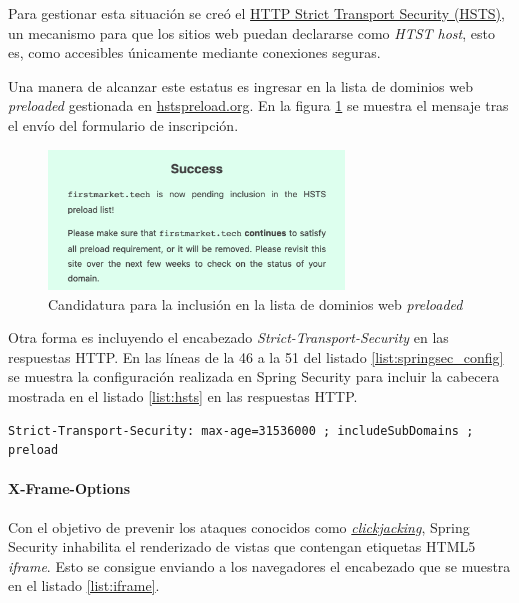 \documentclass[a4paper]{article}
\begin{document}
	Para gestionar esta situación se creó el \href{https://tools.ietf.org/html/rfc6797}{HTTP Strict Transport Security (HSTS)}, un mecanismo para que los sitios web puedan declararse como \emph{HTST host}, esto es, como accesibles únicamente mediante conexiones seguras.
	
	Una manera de alcanzar este estatus es ingresar en la lista de dominios web \emph{preloaded} gestionada en \href{https://hstspreload.org/}{hstspreload.org}. En la figura \ref{fig:preload_list_submission_success} se muestra el mensaje tras el envío del formulario de inscripción.
	
	\begin{figure}[hbt!]
		\centering
		\includegraphics[width=0.7\textwidth,keepaspectratio]{preload_list_submission_success}
		\caption{Candidatura para la inclusión en la lista de dominios web \emph{preloaded}}
		\label{fig:preload_list_submission_success}
	\end{figure}
	
	Otra forma es incluyendo el encabezado \emph{Strict-Transport-Security} en las respuestas HTTP. En las líneas de la 46 a la 51 del listado \ref{list:springsec_config} se muestra la configuración realizada en Spring Security para incluir la cabecera mostrada en el listado \ref{list:hsts} en las respuestas HTTP.
	\\
	
	\begin{lstlisting}[caption=Cabecera de declaración \emph{HSTS host}, label=list:hsts]
	 Strict-Transport-Security: max-age=31536000 ; includeSubDomains ; preload
	\end{lstlisting}
	
	\paragraph{X-Frame-Options}
	Con el objetivo de prevenir los ataques conocidos como \href{https://en.wikipedia.org/wiki/Clickjacking}{\emph{clickjacking}}, Spring Security inhabilita el renderizado de vistas que contengan etiquetas HTML5 \emph{iframe}. Esto se consigue enviando a los navegadores el encabezado que se muestra en el listado \ref{list:iframe}.
	\\
	
\end{document}
